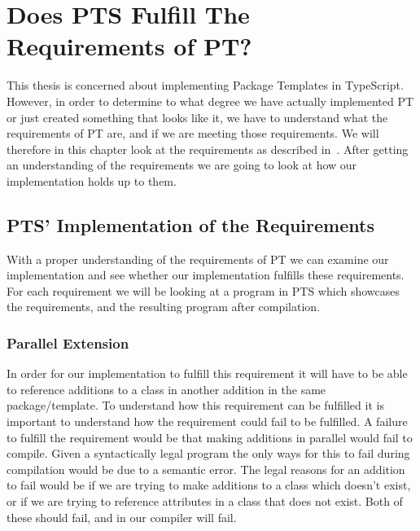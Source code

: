 \chapter{Does PTS Fulfill The Requirements of PT?}\label{ch:does-pts-fulfill-the-requirements-of-pt?}

This thesis is concerned about implementing Package Templates in TypeScript.
However, in order to determine to what degree we have actually implemented PT or just created something that looks like it, we have to understand what the requirements of PT are, and if we are meeting those requirements.
We will therefore in this chapter look at the requirements as described in~\cite{jot}.
After getting an understanding of the requirements we are going to look at how our implementation holds up to them.



\section{PTS' Implementation of the Requirements}\label{sec:pts'-implementation-of-the-requirements}

With a proper understanding of the requirements of PT we can examine our implementation and see whether our implementation fulfills these requirements.
For each requirement we will be looking at a program in PTS which showcases the requirements, and the resulting program after compilation.

\subsection{Parallel Extension}\label{subsec:pts-parallel-extension}

In order for our implementation to fulfill this requirement it will have to be able to reference additions to a class in another addition in the same package/template.
To understand how this requirement can be fulfilled it is important to understand how the requirement could fail to be fulfilled.
A failure to fulfill the requirement would be that making additions in parallel would fail to compile.
Given a syntactically legal program the only ways for this to fail during compilation would be due to a semantic error.
The legal reasons for an addition to fail would be if we are trying to make additions to a class which doesn't exist, or if we are trying to reference attributes in a class that does not exist.
Both of these should fail, and in our compiler will fail.

